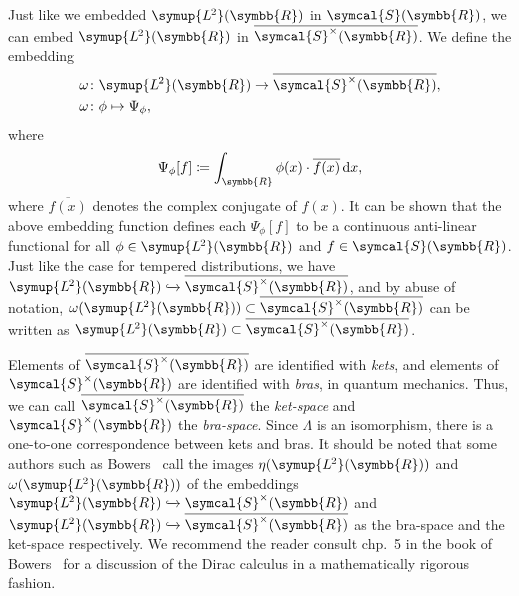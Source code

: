 \documentclass[12pt, a4 paper]{article}
\theoremstyle{definition}
\newcommand{\ltwo}{\symup{L\kern-0.5pt^2}}
\newcommand{\rr}{\symbb{R}}
\newcommand{\ltwor}{\ltwo(\rr)}
\newcommand{\schwartz}{\symcal{S}}
\newcommand{\schwartzr}{\schwartz(\rr)}
\newcommand{\dist}{\schwartz^\times}
\newcommand{\distr}{\dist(\rr)}
\newcommand{\anti}{\overline{\distr}}
\newcommand{\der}{\operatorname{d\!}{}}
\begin{document}
    Just like we embedded $\ltwor$ in $\schwartzr$, we can embed $\ltwor$ in $\anti$. We define the embedding
    \begin{align*}
        \omega &\colon \ltwor \rightarrow \anti,\\
        \omega &\colon \phi \mapsto \Psi_\phi,
    \end{align*}
    where
    \[
    \Psi_\phi [f] \coloneq \int_{\rr} \phi(x) \cdot \overline{f(x)} \der x,
    \]
    where $\overline{f(x)}$ denotes the complex conjugate of $f(x)$.
    It can be shown that the above embedding function defines each $\Psi_\phi[f]$ to be a continuous anti-linear functional for all $\phi \in \ltwor$ and $f \in \schwartzr$. Just like the case for tempered distributions, we have $\ltwor \xhookrightarrow{} \anti$, and by abuse of notation, $\omega(\ltwor) \subset \anti$ can be written as $\ltwor \subset \anti$.

    Elements of $\anti$ are identified with \textit{kets}, and elements of $\distr$ are identified with \textit{bras}, in quantum mechanics. Thus, we can call $\anti$ the \textit{ket-space} and $\distr$ the \textit{bra-space}. Since $\Lambda$ is an isomorphism, there is a one-to-one correspondence between kets and bras. It should be noted that some authors such as Bowers~\cite[chp.~5]{Bowers} call the images $\eta(\ltwor)$ and $\omega(\ltwor)$ of the embeddings $\ltwor \xhookrightarrow{} \distr$ and $\ltwor \xhookrightarrow{} \anti$ as the bra-space and the ket-space respectively. We recommend the reader consult chp.~5 in the book of Bowers~\cite{Bowers} for a discussion of the Dirac calculus in a mathematically rigorous fashion.
\end{document}
